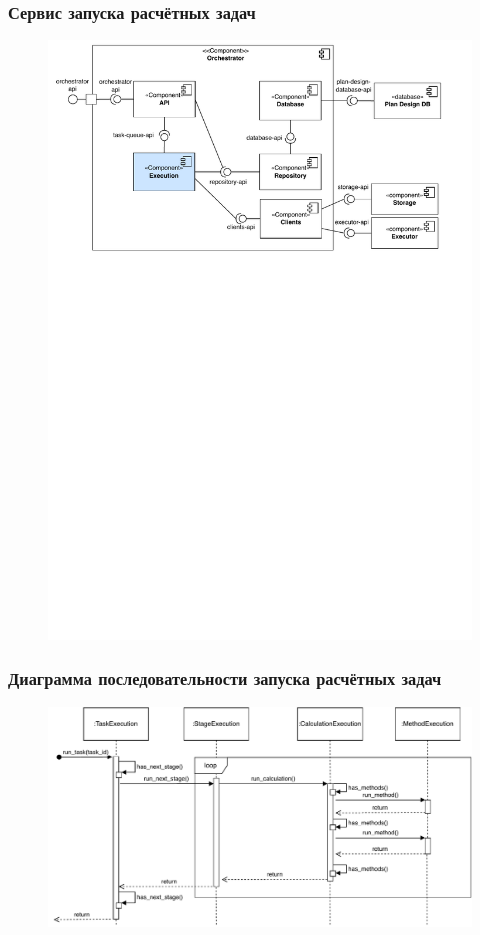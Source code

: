 \begin{frame}
\frametitle{Сервис запуска расчётных задач}
\begin{figure}
    \includegraphics[scale=.6]{pictures/architecture/orchestrator_component_common}
\end{figure}
\end{frame}

\begin{frame}
\frametitle{Диаграмма последовательности запуска расчётных задач}
\begin{figure}
    \includegraphics[scale=.7]{pictures/architecture/orchestrator_sequence}
\end{figure}
\end{frame}
